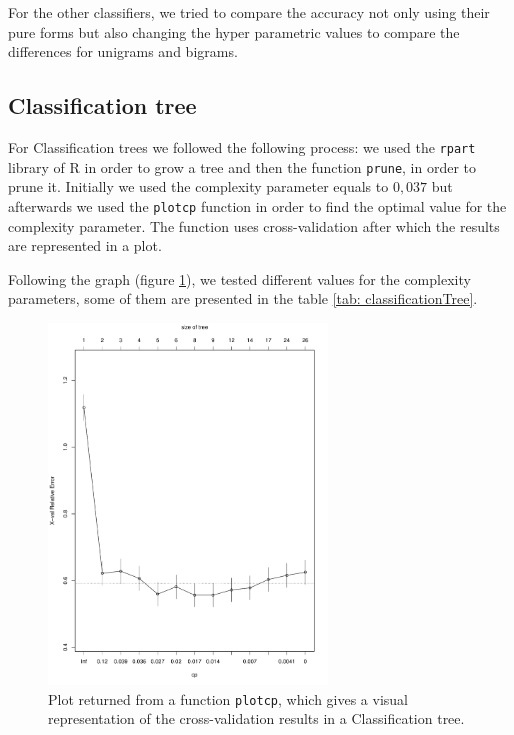 \documentclass[a4paper,11pt]{article}
\begin{document}
For the other classifiers, we tried to compare the accuracy not only using their pure forms but also changing the hyper parametric values to compare the differences for unigrams and bigrams. 

\subsection{Classification tree}

For Classification trees we followed the following process: we used the \verb|rpart| library of R \cite{rpart} in order to grow a tree and then the function \verb|prune|, in order to prune it. Initially we used the complexity parameter equals to  $0{,}037$ but afterwards we used the \verb|plotcp| function in order to find the optimal value for the complexity parameter. The function uses cross-validation after which the results are represented in a plot.

Following the graph (figure \ref{fig: cp}), we tested different values for the complexity parameters, some of them are presented in the table \ref{tab: classificationTree}. 

\begin{figure}[h!]
\centering
\includegraphics[width = 0.66\textwidth]{CP.pdf}
\cprotect\caption{Plot returned from a function \verb|plotcp|, which gives a visual representation of the cross-validation results in a Classification tree.}
\label{fig: cp}
\end{figure}
\end{document}
